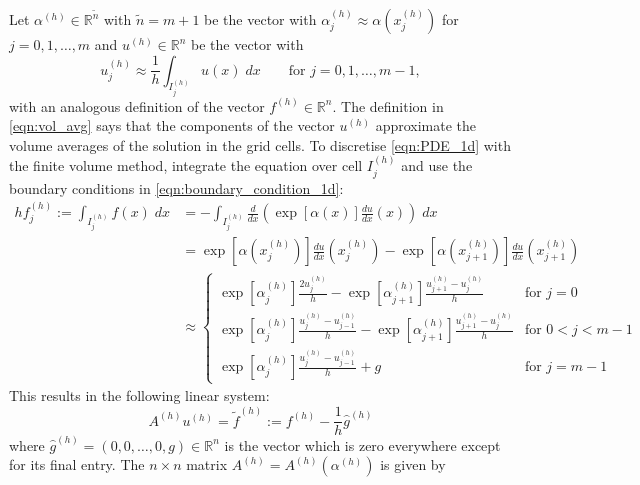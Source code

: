 \documentclass[11pt]{article}
\begin{document}
Let $\alpha^{(h)}\in\mathbb{R}^{\widetilde{n}}$ with $\widetilde{n}=m+1$ be the vector with $\alpha^{(h)}_j\approx \alpha(x^{(h)}_j)$ for $j=0,1,\dots,m$ and $u^{(h)}\in\mathbb{R}^{n}$ be the vector with
\begin{equation}
    u^{(h)}_j\approx \frac{1}{h}\int_{I^{(h)}_j} u(x)\; dx\qquad\text{for $j=0,1,\dots,m-1$},\label{eqn:vol_avg}
\end{equation}
with an analogous definition of the vector $f^{(h)}\in \mathbb{R}^n$. The definition in \eqref{eqn:vol_avg} says that the components of the vector $u^{(h)}$ approximate the volume averages of the solution in the grid cells. To discretise \eqref{eqn:PDE_1d} with the finite volume method, integrate the equation over cell $I_j^{(h)}$ and use the boundary conditions in \eqref{eqn:boundary_condition_1d}:
\begin{equation}
    \begin{aligned}
       hf^{(h)}_j :=\int_{I^{(h)}_j} f(x)\;dx&=
    -\int_{I^{(h)}_j} \frac{d}{dx}\left(\exp[\alpha(x)]\frac{du}{dx}(x)\right)\;dx \\
    &=\exp[\alpha(x^{(h)}_{j})]\frac{du}{dx}(x^{(h)}_{j})-\exp[\alpha(x^{(h)}_{j+1})]\frac{du}{dx}(x^{(h)}_{j+1})\\
    &\approx \begin{cases}
        \exp[\alpha^{(h)}_{j}]\frac{2u^{(h)}_j}{h}-\exp[\alpha^{(h)}_{j+1}]\frac{u^{(h)}_{j+1}-u^{(h)}_j}{h}&\text{for $j=0$}\\
        \exp[\alpha^{(h)}_{j}]\frac{u^{(h)}_j-u^{(h)}_{j-1}}{h}-\exp[\alpha^{(h)}_{j+1}]\frac{u^{(h)}_{j+1}-u^{(h)}_j}{h}&\text{for $0<j<m-1$}\\ 
        \exp[\alpha^{(h)}_{j}]\frac{u^{(h)}_j-u^{(h)}_{j-1}}{h}+g&\text{for $j=m-1$}
    \end{cases}
    \end{aligned}  
\end{equation}
This results in the following linear system:
\begin{equation}
A^{(h)} u^{(h)} = \widetilde{f}^{(h)} := f^{(h)}-\frac{1}{h}\widehat{g}^{(h)} \label{eqn:discrete_system_1d}
\end{equation}
where $\widehat{g}^{(h)}=(0,0,\dots,0,g)\in\mathbb{R}^{n}$ is the vector which is zero everywhere except for its final entry. The $n\times n$ matrix $A^{(h)} = A^{(h)}(\alpha^{(h)})$ is given by
\end{document}
